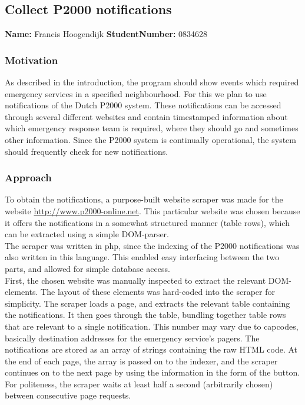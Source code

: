 \subsection{Collect P2000 notifications}
\textbf{Name:} Francis Hoogendijk \indent \textbf{StudentNumber:} 0834628

\subsubsection*{Motivation}
As described in the introduction, the program should show events which required emergency services in a specified neighbourhood. For this we plan to use notifications of the Dutch P2000 system. These notifications can be accessed through several different websites and contain timestamped information about which emergency response team is required, where they should go and sometimes other information. Since the P2000 system is continually operational, the system should frequently check for new notifications.

\subsubsection*{Approach}
To obtain the notifications, a purpose-built website scraper was made for the website \url{http://www.p2000-online.net}. This particular website was chosen because it offers the notifications in a somewhat structured manner (table rows), which can be extracted using a simple DOM-parser.\\

The scraper was written in php, since the indexing of the P2000 notifications was also written in this language. This enabled easy interfacing between the two parts, and allowed for simple database access. \\

First, the chosen website was manually inspected to extract the relevant DOM-elements. The layout of these elements was hard-coded into the scraper for simplicity. The scraper loads a page, and extracts the relevant table containing the notifications. It then goes through the table, bundling together table rows that are relevant to a single notification. This number may vary due to capcodes, basically destination addresses for the emergency service's pagers. The notifications are stored as an array of strings containing the raw HTML code. At the end of each page, the array is passed on to the indexer, and the scraper continues on to the next page by using the information in the form of the button. For politeness, the scraper waits at least half a second (arbitrarily chosen) between consecutive page requests.\\

